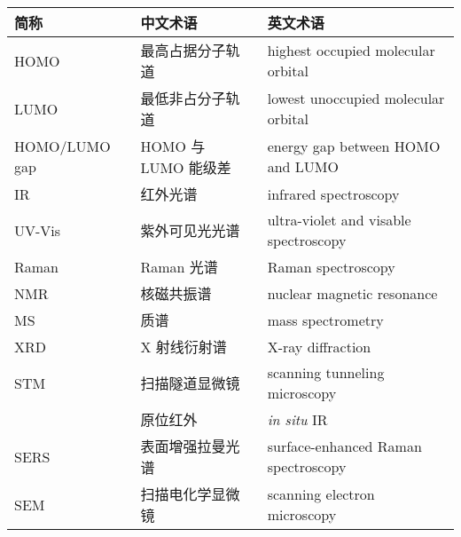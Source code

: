 \begin{longtable}{lll}
    \hline 简称 & 中文术语 & 英文术语 \\ \hline \endhead
    \hline \endfoot
    HOMO & 最高占据分子轨道 & highest occupied molecular orbital \\
    LUMO & 最低非占分子轨道 & lowest unoccupied molecular orbital \\
    HOMO/LUMO gap & HOMO 与 LUMO 能级差 & energy gap between HOMO and LUMO \\
    IR & 红外光谱 & infrared spectroscopy \\
    UV-Vis & 紫外可见光光谱 & ultra-violet and visable spectroscopy \\
    Raman & Raman 光谱 & Raman spectroscopy \\
    NMR & 核磁共振谱 & nuclear magnetic resonance \\
    MS & 质谱 & mass spectrometry \\
    XRD & X 射线衍射谱 & X-ray diffraction \\
    STM & 扫描隧道显微镜 & scanning tunneling microscopy \\
    & 原位红外 & \emph{in situ} IR \\
    SERS & 表面增强拉曼光谱 & surface-enhanced Raman spectroscopy \\
    SEM & 扫描电化学显微镜 & scanning electron microscopy \\
\end{longtable}

\endgroup